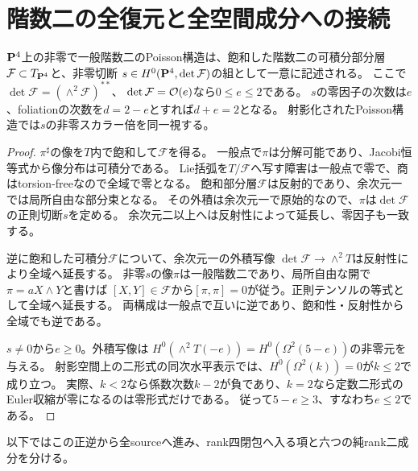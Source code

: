 \section{階数二の全復元と全空間成分への接続}\label{sec:rank-two-reconstruction}
\begin{proposition}[階数二の構造的入口]\label{prop:ranktwo}
$\mathbf P^4$上の非零で一般階数二のPoisson構造は、飽和した階数二の可積分部分層
$\mathcal F\subset T_{\mathbf P^4}$と、非零切断
$s\in H^0(\mathbf P^4,\det\mathcal F)$の組として一意に記述される。
ここで$\det\mathcal F=(\wedge^2\mathcal F)^{**}$、
$\det\mathcal F=\mathcal O(e)$なら$0\le e\le2$である。
$s$の零因子の次数は$e$、foliationの次数を$d=2-e$とすれば$d+e=2$となる。
射影化されたPoisson構造では$s$の非零スカラー倍を同一視する。
\end{proposition}
\begin{proof}
$\pi^\sharp$の像を$T$内で飽和して$\mathcal F$を得る。
一般点で$\pi$は分解可能であり、Jacobi恒等式から像分布は可積分である。
Lie括弧を$T/\mathcal F$へ写す障害は一般点で零で、商はtorsion-freeなので全域で零となる。
飽和部分層$\mathcal F$は反射的であり、余次元一では局所自由な部分束となる。
その外積は余次元一で原始的なので、$\pi$は$\det\mathcal F$の正則切断$s$を定める。
余次元二以上へは反射性によって延長し、零因子も一致する。

逆に飽和した可積分$\mathcal F$について、余次元一の外積写像
$\det\mathcal F\to\wedge^2T$は反射性により全域へ延長する。
非零$s$の像$\pi$は一般階数二であり、局所自由な開で$\pi=aX\wedge Y$と書けば
$[X,Y]\in\mathcal F$から$[\pi,\pi]=0$が従う。正則テンソルの等式として全域へ延長する。
両構成は一般点で互いに逆であり、飽和性・反射性から全域でも逆である。

$s\ne0$から$e\ge0$。外積写像は
$H^0(\wedge^2T(-e))=H^0(\Omega^2(5-e))$の非零元を与える。
射影空間上の二形式の同次水平表示では、$H^0(\Omega^2(k))=0$が$k\le2$で成り立つ。
実際、$k<2$なら係数次数$k-2$が負であり、$k=2$なら定数二形式のEuler収縮が零になるのは零形式だけである。
従って$5-e\ge3$、すなわち$e\le2$である。
\end{proof}

以下ではこの正逆から全sourceへ進み、rank四閉包へ入る項と六つの純rank二成分を分ける。

